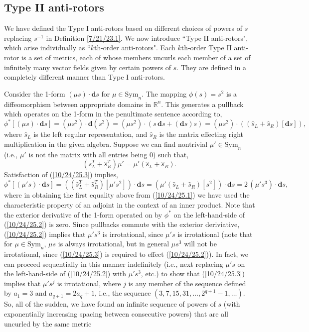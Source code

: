 \documentclass{amsart}
\theoremstyle{definition}
\numberwithin{theorem}{section}
\numberwithin{equation}{section}
\begin{document}
\subsection{Type II anti-rotors}
We have defined the Type I anti-rotors based on different choices of powers of $s$ replacing $s^{-1}$ in Definition \ref{7/21/23.1}.  We now introduce ``Type II anti-rotors", which arise individually as ``$k$th-order anti-rotors".  Each $k$th-order Type II anti-rotor is a set of metrics, each of whose members uncurls each member of a set of infinitely many vector fields given by certain powers of $s$.  They are defined in a completely different manner than Type I anti-rotors.
   
Consider the 1-form $(\mu s)\cdot \mathbf{d}s$ for $\mu\in \text{Sym}_n$.    The mapping $\phi(s) = s^2$ is a diffeomorphism between appropriate domains in $\mathbb{R}^n$.  This generates a pullback which operates on the 1-form in the penultimate sentence according to, \begin{equation}\label{10/24/25.1} \phi^* \left[(\mu s)\cdot\mathbf{d}s\right] =  (\mu s^2)\cdot \mathbf{d}(s^2) = (\mu s^2)\cdot (s\,\mathbf{d}s + (\mathbf{d}s)s) = (\mu s^2)\cdot ((\hat{s}_L+\hat{s}_R)[\mathbf{d}s]),\end{equation} where $\hat{s}_L$ is the left regular representation, and $\hat{s}_R$ is the matrix effecting right multiplication in the given algebra.  Suppose we can find nontrivial $\mu'\in \text{Sym}_n$ (i.e., $\mu'$ is not the matrix with all entries being 0) such that, \begin{equation}\label{10/24/25.3}(\hat{s}^T_L+\hat{s}_R^T)\mu' = \mu'(\hat{s}_L+\hat{s}_R).\end{equation}   Satisfaction of (\ref{10/24/25.3}) implies, \begin{equation}\label{10/24/25.2} \phi^* \left[(\mu' s)\cdot\mathbf{d}s\right]  =\left((\hat{s}^T_L+\hat{s}_R^T) [\mu' s^2]\right)\cdot\mathbf{d}s =  (\mu'(\hat{s}_L+\hat{s}_R)[s^2])\cdot\mathbf{d}s = 2\, (\mu' s^3) \cdot \mathbf{d}s,\end{equation}  where in obtaining the first equality above from (\ref{10/24/25.1}) we have used the characteristic property of an adjoint in the context of an inner product.  Note that the exterior derivative of the 1-form operated on by $\phi^*$ on the left-hand-side of (\ref{10/24/25.2}) is zero.  Since pullbacks commute with the exterior deriviative, (\ref{10/24/25.2}) implies that $\mu's^3$ is irrotational, since $\mu' s$ is irrotational (note that for $\mu\in \text{Sym}_n$, $\mu s$ is always irrotational, but in general $\mu s^3$ will not be irrotational, since (\ref{10/24/25.3}) is required to effect (\ref{10/24/25.2})).  In fact, we can proceed sequentially in this manner indefinitely (i.e., next replacing $\mu' s$ on the left-hand-side of (\ref{10/24/25.2}) with $\mu' s^3$, etc.) to show that (\ref{10/24/25.3}) implies that $\mu's^j$ is irrotational, where $j$ is any member of the sequence defined by $a_1=3$ and $a_{q+1} = 2a_q +1$, i.e., the sequence $(3, 7, 15, 31, \dots, 2^{q+1} -1,\dots)$.  So, all of the sudden, we have found an infinite sequence of powers of $s$ (with exponentially increasing spacing between consecutive powers) that are all uncurled by the same metric 
\end{document}
